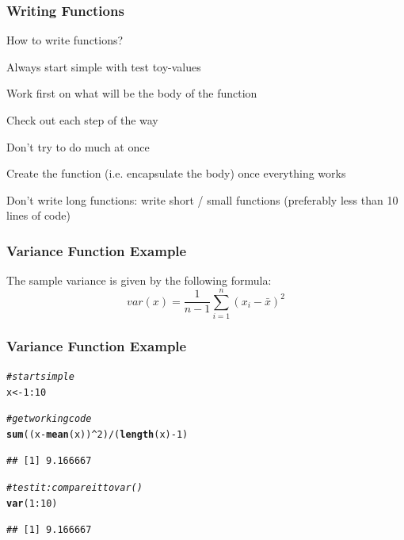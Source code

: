 \documentclass[12pt]{beamer}\usepackage[]{graphicx}\usepackage[]{color}
\makeatletter
\newcommand{\hlnum}[1]{\textcolor[rgb]{0.686,0.059,0.569}{#1}}%
\newcommand{\hlcom}[1]{\textcolor[rgb]{0.678,0.584,0.686}{\textit{#1}}}%
\newcommand{\hlopt}[1]{\textcolor[rgb]{0,0,0}{#1}}%
\newcommand{\hlstd}[1]{\textcolor[rgb]{0.345,0.345,0.345}{#1}}%
\newcommand{\hlkwb}[1]{\textcolor[rgb]{0.69,0.353,0.396}{#1}}%
\newcommand{\hlkwd}[1]{\textcolor[rgb]{0.737,0.353,0.396}{\textbf{#1}}}%
\newenvironment{kframe}{%
 \def\at@end@of@kframe{}%
 \ifinner\ifhmode%
  \def\at@end@of@kframe{\end{minipage}}%
  \begin{minipage}{\columnwidth}%
 \fi\fi%
 \def\FrameCommand##1{\hskip\@totalleftmargin \hskip-\fboxsep
 \colorbox{shadecolor}{##1}\hskip-\fboxsep
     \hskip-\linewidth \hskip-\@totalleftmargin \hskip\columnwidth}%
 \MakeFramed {\advance\hsize-\width
   \@totalleftmargin\z@ \linewidth\hsize
   \@setminipage}}%
 {\par\unskip\endMakeFramed%
 \at@end@of@kframe}
\newenvironment{knitrout}{}{} %
\makeatother
\begin{document}

\begin{frame}
\begin{center}
\Huge{}
\end{center}
\end{frame}


\begin{frame}[fragile]
\frametitle{Writing Functions}

How to write functions?
\bi
  \item Always start simple with test toy-values
  \item Work first on what will be the body of the function
  \item Check out each step of the way
  \item Don't try to do much at once
  \item Create the function (i.e. encapsulate the body) once everything works
  \item Don't write long functions: write short / small functions (preferably less than 10 lines of code)
\ei

\end{frame}


\begin{frame}[fragile]
\frametitle{Variance Function Example}

The sample variance is given by the following formula:
$$
var(x) = \frac{1}{n-1} \sum_{i=1}^{n} (x_i - \bar{x})^2
$$

\end{frame}


\begin{frame}[fragile]
\frametitle{Variance Function Example}

\begin{knitrout}\footnotesize
{}\color{fgcolor}\begin{kframe}
\begin{alltt}
\hlcom{# start simple}
\hlstd{x} \hlkwb{<-} \hlnum{1}\hlopt{:}\hlnum{10}

\hlcom{# get working code}
\hlkwd{sum}\hlstd{((x} \hlopt{-} \hlkwd{mean}\hlstd{(x))}\hlopt{^}\hlnum{2}\hlstd{)} \hlopt{/} \hlstd{(}\hlkwd{length}\hlstd{(x)} \hlopt{-} \hlnum{1}\hlstd{)}
\end{alltt}
\begin{verbatim}
## [1] 9.166667
\end{verbatim}
\begin{alltt}
\hlcom{# test it: compare it to var()}
\hlkwd{var}\hlstd{(}\hlnum{1}\hlopt{:}\hlnum{10}\hlstd{)}
\end{alltt}
\begin{verbatim}
## [1] 9.166667
\end{verbatim}
\end{kframe}
\end{knitrout}

\end{frame}
\end{document}
